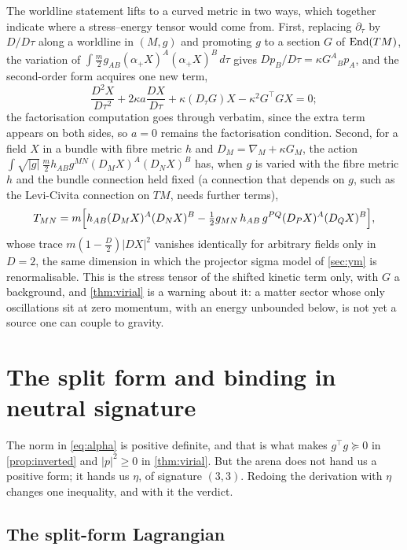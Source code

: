 The worldline statement lifts to a curved metric in two ways, which together indicate where a stress--energy tensor would come from.
First, replacing $\partial_\tau$ by $D/D\tau$ along a worldline in $(M,g)$ and promoting $g$ to a section $G$ of $\operatorname{End}(TM)$, the variation of
$\int\tfrac m2g_{AB}(\alpha_+X)^A(\alpha_+X)^B\,d\tau$ gives $Dp_B/D\tau=\kappa G^A{}_Bp_A$, and the second-order form acquires one new term,
\[
\frac{D^2X}{D\tau^2}+2\kappa a\frac{DX}{D\tau}+\kappa(D_\tau G)X-\kappa^2G^{\!\top}GX=0 ;
\]
the factorisation computation goes through verbatim, since the extra term appears on both sides, so $a=0$ remains the factorisation
condition. Second, for a field $X$ in a bundle with fibre metric $h$ and $D_M=\nabla_M+\kappa G_M$, the action
$\int\sqrt{|g|}\,\tfrac m2h_{AB}g^{MN}(D_MX)^A(D_NX)^B$ has, when $g$ is varied with the fibre metric $h$ and the bundle connection held fixed
(a connection that depends on $g$, such as the Levi-Civita connection on $TM$, needs further terms),
\[
T_{MN}=m\Bigl[h_{AB}(D_MX)^A(D_NX)^B-\tfrac12g_{MN}\,h_{AB}\,g^{PQ}(D_PX)^A(D_QX)^B\Bigr],
\]
whose trace $m(1-\tfrac D2)|DX|^2$ vanishes identically for arbitrary fields only in $D=2$, the same dimension in which the projector sigma model of \cref{sec:ym} is
renormalisable. This is the stress tensor of the shifted kinetic term only, with $G$ a background, and \cref{thm:virial} is a warning about
it: a matter sector whose only oscillations sit at zero momentum, with an energy unbounded below, is not yet a source one can couple to
gravity.



\section{The split form and binding in neutral signature}
\label{sec:neutral}

The norm in \eqref{eq:alpha} is positive definite, and that is what makes $g^{\!\top}g\succeq0$ in \cref{prop:inverted} and $|p|^2\ge0$ in
\cref{thm:virial}. But the arena does not hand us a positive form; it hands us $\eta$, of signature $(3,3)$. Redoing the derivation with
$\eta$ changes one inequality, and with it the verdict.

\subsection{The split-form Lagrangian}

